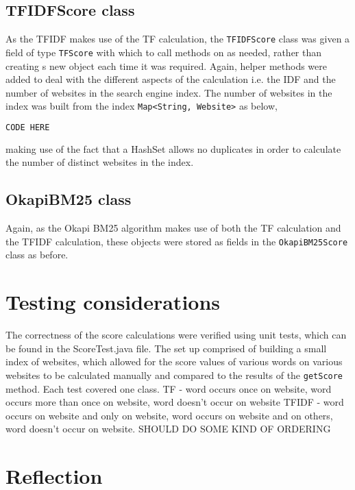 \subsection{TFIDFScore class}
As the TFIDF makes use of the TF calculation, the {\tt TFIDFScore} class was given a field of type {\tt TFScore} with which to call methods on as needed, rather than creating s new object each time it was required.
Again, helper methods were added to deal with the different aspects of the calculation i.e. the IDF and the number of websites in the search engine index.
The number of websites in the index was built from the index {\tt Map<String, Website>} as below,

\begin{lstlisting}[language=Java]
    CODE HERE
\end{lstlisting}

making use of the fact that a HashSet allows no duplicates in order to calculate the number of distinct websites in the index.

\subsection{OkapiBM25 class}
Again, as the Okapi BM25 algorithm makes use of both the TF calculation and the TFIDF calculation, these objects were stored as fields in the {\tt OkapiBM25Score} class as before.


\section{Testing considerations}
The correctness of the score calculations were verified using unit tests, which can be found in the ScoreTest.java file.
The set up comprised of building a small index of websites, which allowed for the score values of various words on various
websites to be calculated manually and compared to the results of the {\tt getScore} method.
Each test covered one class.
TF - word occurs once on website, word occurs more than once on website, word doesn't occur on website
TFIDF - word occurs on website and only on website, word occurs on website and on others, word doesn't occur on website. SHOULD DO SOME KIND OF ORDERING

\section{Reflection}
